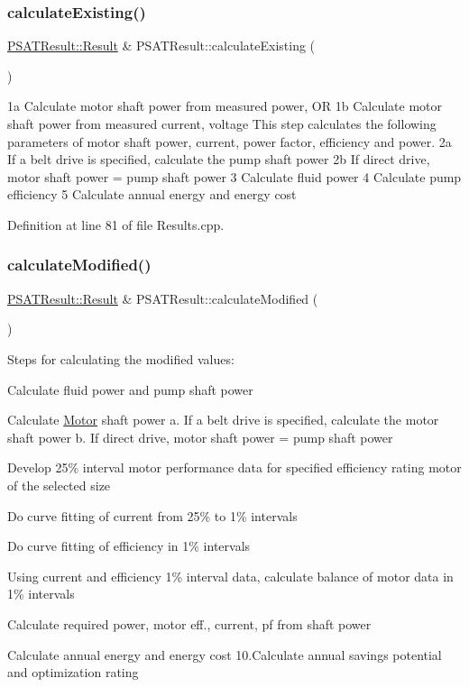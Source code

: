 \subsubsection{\texorpdfstring{calculate\+Existing()}{calculateExisting()}}
{\footnotesize\ttfamily \hyperlink{struct_p_s_a_t_result_1_1_result}{P\+S\+A\+T\+Result\+::\+Result} \& P\+S\+A\+T\+Result\+::calculate\+Existing (\begin{DoxyParamCaption}{ }\end{DoxyParamCaption})}

1a Calculate motor shaft power from measured power, OR 1b Calculate motor shaft power from measured current, voltage This step calculates the following parameters of motor shaft power, current, power factor, efficiency and power. 2a If a belt drive is specified, calculate the pump shaft power 2b If direct drive, motor shaft power = pump shaft power 3 Calculate fluid power 4 Calculate pump efficiency 5 Calculate annual energy and energy cost

Definition at line 81 of file Results.\+cpp.

\mbox{\label{class_p_s_a_t_result_a1404ffd1e9420afd3ff4e9284d145646}} 
\subsubsection{\texorpdfstring{calculate\+Modified()}{calculateModified()}}
{\footnotesize\ttfamily \hyperlink{struct_p_s_a_t_result_1_1_result}{P\+S\+A\+T\+Result\+::\+Result} \& P\+S\+A\+T\+Result\+::calculate\+Modified (\begin{DoxyParamCaption}{ }\end{DoxyParamCaption})}

Steps for calculating the modified values\+:
\begin{DoxyEnumerate}
\item Calculate fluid power and pump shaft power
\item Calculate \hyperlink{struct_motor}{Motor} shaft power a. If a belt drive is specified, calculate the motor shaft power b. If direct drive, motor shaft power = pump shaft power
\item Develop 25\% interval motor performance data for specified efficiency rating motor of the selected size
\item Do curve fitting of current from 25\% to 1\% intervals
\item Do curve fitting of efficiency in 1\% intervals
\item Using current and efficiency 1\% interval data, calculate balance of motor data in 1\% intervals
\item Calculate required power, motor eff., current, pf from shaft power
\item Calculate annual energy and energy cost 10.\+Calculate annual savings potential and optimization rating
\end{DoxyEnumerate}

